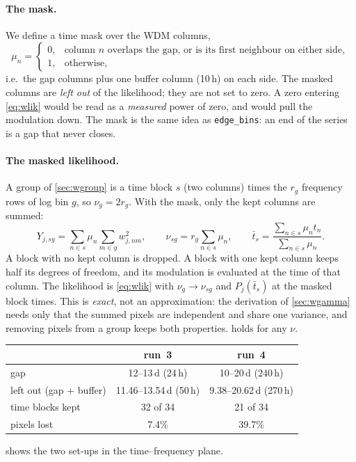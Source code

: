 \documentclass[11pt,a4paper]{article}
\begin{document}
\paragraph{The mask.} We define a time mask over the WDM columns,
\begin{equation}
  \mu_n = \begin{cases}
    0, & \text{column } n \text{ overlaps the gap, or is its first neighbour on either side},\\
    1, & \text{otherwise},
  \end{cases}
\end{equation}
i.e.\ the gap columns plus one buffer column (10\,h) on each side. The masked columns
are \emph{left out} of the likelihood; they are not set to zero. A zero entering
\cref{eq:wlik} would be read as a \emph{measured} power of zero, and would pull the
modulation down. The mask is the same idea as \texttt{edge\_bins}: an end of the series
is a gap that never closes.

\paragraph{The masked likelihood.} A group of \cref{sec:wgroup} is a time block $s$
(two columns) times the $r_g$ frequency rows of log bin $g$, so $\nu_g=2r_g$. With the
mask, only the kept columns are summed:
\begin{equation}
  Y_{j,sg} = \sum_{n\in s}\mu_n\sum_{m\in g}w^2_{j,nm},\qquad
  \nu_{sg} = r_g\sum_{n\in s}\mu_n,\qquad
  \bar t_s = \frac{\sum_{n\in s}\mu_n t_n}{\sum_{n\in s}\mu_n}.
  \label{eq:Ymask}
\end{equation}
A block with no kept column is dropped. A block with one kept column keeps half its
degrees of freedom, and its modulation is evaluated at the time of that column. The
likelihood is \cref{eq:wlik} with $\nu_g\to\nu_{sg}$ and $P_j(\bar t_s)$ at the
masked block times. This is \emph{exact}, not an approximation: the derivation of
\cref{sec:wgamma} needs only that the summed pixels are independent and share one
variance, and removing pixels from a group keeps both properties. 
holds for any $\nu$.

\begin{center}
\renewcommand{\arraystretch}{1.15}
\small
\begin{tabular}{@{}lcc@{}}
\toprule
 & run~3 & run~4 \\
\midrule
gap & 12--13\,d (24\,h) & 10--20\,d (240\,h) \\
left out (gap + buffer) & 11.46--13.54\,d (50\,h) & 9.38--20.62\,d (270\,h) \\
time blocks kept & 32 of 34 & 21 of 34 \\
pixels lost & 7.4\% & 39.7\% \\
\bottomrule
\end{tabular}
\end{center}
 shows the two set-ups in the time--frequency plane.
\end{document}
